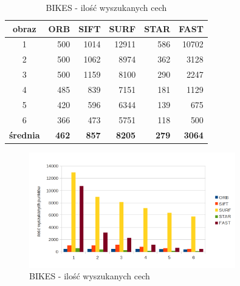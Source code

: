 \begin{table}[htbp]
  \centering
  \caption{BIKES - ilość wyszukanych cech}
    \begin{tabular}{|c|r|r|r|r|r|}\hline
    
    obraz & \textbf{ORB} & \textbf{SIFT} & \textbf{SURF} & \textbf{STAR} & \textbf{FAST} \\\hline
    
   
    1 & 500 & 1014 & 12911 & 586 & 10702 \\
    2 & 500 & 1062 & 8974 & 362 & 3128 \\
    3 & 500 & 1159 & 8100 & 290 & 2247 \\
    4 & 485 & 839 & 7151 & 181 & 1129 \\
    5 & 420 & 596 & 6344 & 139 & 675 \\
    6 & 366 & 473 & 5751 & 118 & 500 \\\hline
    \textbf{średnia} & \textbf{462} & \textbf{857} & \textbf{8205} & \textbf{279} & \textbf{3064} \\
    \hline
    \end{tabular}%
  \label{tab:bikes_f1}%
\end{table}%


\begin{figure}
\centering
\includegraphics[width=0.8\textwidth]{pict/mikolajczyk/bikes/f1.png}
\caption{BIKES - ilość wyszukanych cech}
\label{fig:bikes_f1}
\end{figure}


